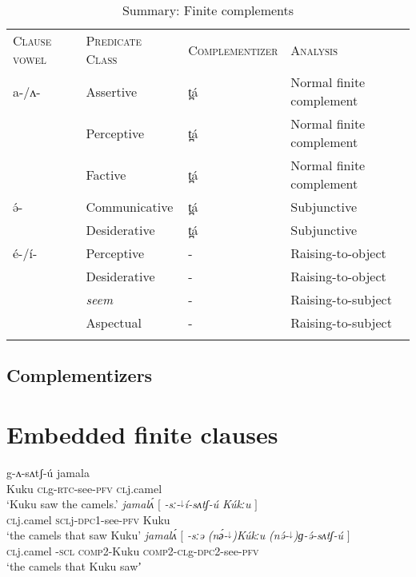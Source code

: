 \begin{table} 
	\caption{Summary: Finite complements}
\begin{tabular}[t]{llll}
\lsptoprule
\textsc{Clause vowel} & \textsc{Predicate Class} & \textsc{Complementizer} & \textsc{Analysis} \\
\lspmidrule
	a-/ʌ- 	& Assertive 		& t̪á 		& Normal finite complement \\
 		  & Perceptive	 	& t̪á 		& Normal finite complement \\
   		& Factive 			& t̪á 		& Normal finite complement \\ 
\midrule 
	 ə́- 	& Communicative	 & t̪á 	& Subjunctive \\ 
	 	& Desiderative &  t̪á 	& Subjunctive \\
\midrule 
	é-/í- & Perceptive 		& - 		& Raising-to-object \\
   		& Desiderative		 & - 		& Raising-to-object \\
  		 & \textit{seem} 		& - 		& Raising-to-subject \\ 
  		 & Aspectual 		& - 		& Raising-to-subject \\
\lspbottomrule
\end{tabular}
\end{table}

\subsection{Complementizers}

\section{Embedded finite clauses} \label{sec:ch15:finiteclauses}


\ea	\ea {} {g-{ʌ}-sʌtʃ-ú} {jamala}\\	
		Kuku  \textsc{cl}g-\textsc{rtc}-see-\textsc{pfv}	\textsc{cl}j.camel	\\
	\glt‘Kuku saw the camels.’ \label{ex:ch15:fin1}
	\ex	\gll \textit{jamalʌ́}			$[$	\textit{-sː-$^{↓}${í}-sʌtʃ-ú} 		\textit{Kúkːu}	$]$ \\	
		\textsc{cl}j.camel		{}	\textsc{scl}j-\textsc{dpc1}-see-\textsc{pfv}		Kuku\\
	\glt 		\glt ‘the camels that saw Kuku’ \label{ex:ch15:fin2}
	\ex	\gll \textit{jamalʌ́}	 $[$ \textit{-sːə}		\textit{(nә́-$^{↓}$)Kúkːu}	\textit{(nə́-$^{↓}$)ɡ-{ə́}-sʌtʃ-ú} $]$\\	
 		\textsc{cl}j.camel {}	-\textsc{scl} 	\textsc{comp2}-Kuku		\textsc{comp2}-\textsc{cl}g-\textsc{dpc2}-see-\textsc{pfv} {} \\
		\glt ‘the camels that Kuku sawʼ \label{nsrc} \label{ex:ch15:fin3}
	\z 
	\z 



